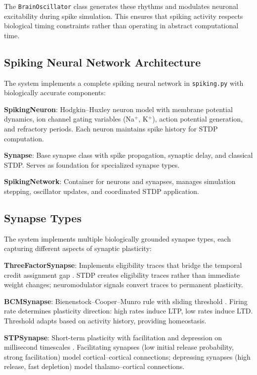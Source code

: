 \documentclass[11pt]{article}
\begin{document}
The \texttt{BrainOscillator} class generates these rhythms and modulates neuronal excitability during spike simulation. This ensures that spiking activity respects biological timing constraints rather than operating in abstract computational time.

\subsection{Spiking Neural Network Architecture}

The system implements a complete spiking neural network in \texttt{spiking.py} with biologically accurate components:

\textbf{SpikingNeuron}: Hodgkin--Huxley neuron model with membrane potential dynamics, ion channel gating variables (Na$^+$, K$^+$), action potential generation, and refractory periods. Each neuron maintains spike history for STDP computation.

\textbf{Synapse}: Base synapse class with spike propagation, synaptic delay, and classical STDP. Serves as foundation for specialized synapse types.

\textbf{SpikingNetwork}: Container for neurons and synapses, manages simulation stepping, oscillator updates, and coordinated STDP application.

\subsection{Synapse Types}

The system implements multiple biologically grounded synapse types, each capturing different aspects of synaptic plasticity:

\textbf{ThreeFactorSynapse}: Implements eligibility traces that bridge the temporal credit assignment gap \citep{gerstner2018eligibility}. STDP creates eligibility traces rather than immediate weight changes; neuromodulator signals convert traces to permanent plasticity.

\textbf{BCMSynapse}: Bienenstock--Cooper--Munro rule with sliding threshold \citep{bienenstock1982theory}. Firing rate determines plasticity direction: high rates induce LTP, low rates induce LTD. Threshold adapts based on activity history, providing homeostasis.

\textbf{STPSynapse}: Short-term plasticity with facilitation and depression on millisecond timescales \citep{tsodyks1997neural}. Facilitating synapses (low initial release probability, strong facilitation) model cortical--cortical connections; depressing synapses (high release, fast depletion) model thalamo--cortical connections.
\end{document}
